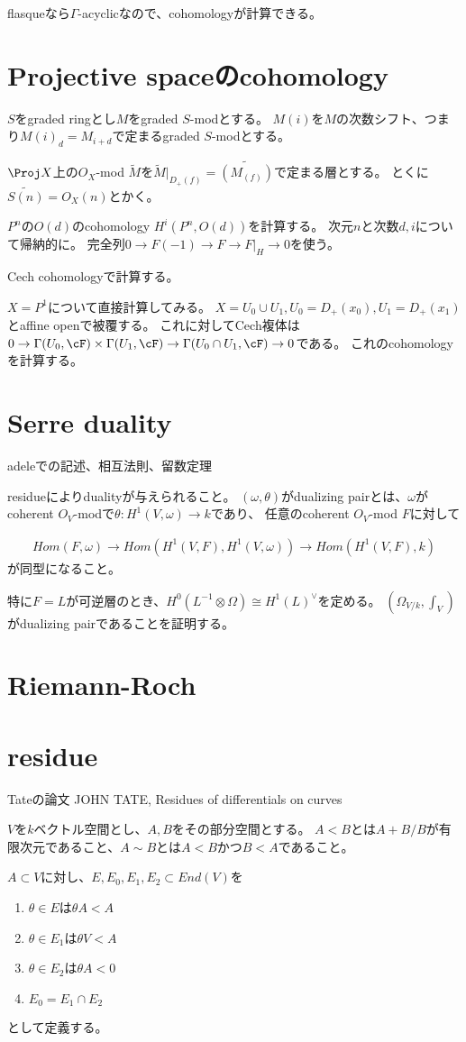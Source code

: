 \documentclass{jsarticle}
\begin{document}
flasqueなら$\Gamma$-acyclicなので、cohomologyが計算できる。

\section{Projective spaceのcohomology}
$S$をgraded ringとし$M$をgraded $S$-modとする。
$M(i)$を$M$の次数シフト、つまり$M(i)_d=M_{i+d}$で定まるgraded $S$-modとする。

$\Proj X$上の$O_X$-mod $\tilde{M}$を$\tilde{M}\vert_{D_+(f)}=\tilde{(M_{(f)})}$で定まる層とする。
とくに$\tilde{S(n)}=O_X(n)$とかく。

$P^n$の$O(d)$のcohomology $H^i(P^n, O(d))$を計算する。
次元$n$と次数$d, i$について帰納的に。
完全列$0 \to F(-1) \to F \to F\vert_H \to 0$を使う。

Cech cohomologyで計算する。

$X=P^1$について直接計算してみる。
$X=U_0 \cup U_1, U_0=D_+(x_0), U_1=D_+(x_1)$とaffine openで被覆する。
これに対してCech複体は$0 \to \Gamma(U_0, \cF) \times \Gamma(U_1, \cF) \to \Gamma(U_0\cap U_1, \cF)\to 0$である。
これのcohomologyを計算する。

\section{Serre duality}
adeleでの記述、相互法則、留数定理

residueによりdualityが与えられること。
$(\omega,\theta)$がdualizing pairとは、$\omega$がcoherent $O_V$-modで$\theta:H^1(V,\omega) \to k$であり、
任意のcoherent $O_V$-mod $F$に対して

\begin{align*}
Hom(F,\omega)\to Hom(H^1(V,F),H^1(V,\omega))\to Hom(H^1(V,F),k)
\end{align*}
が同型になること。

特に$F=L$が可逆層のとき、$H^0(L^{-1}\otimes\Omega)\cong H^1(L)^\vee$を定める。
$(\Omega_{V/k}, \int_V)$がdualizing pairであることを証明する。

\section{Riemann-Roch}

\section{residue}
Tateの論文
JOHN TATE, Residues of differentials on curves
\begin{dfn}
$V$を$k$ベクトル空間とし、$A, B$をその部分空間とする。
$A<B$とは$A+B/B$が有限次元であること、$A\sim B$とは$A<B$かつ$B<A$であること。

$A\subset V$に対し、$E, E_0, E_1, E_2\subset End(V)$を
\begin{enumerate}
\item $\theta\in E$は$\theta A<A$
\item $\theta\in E_1$は$\theta V<A$
\item $\theta\in E_2$は$\theta A<0$
\item $E_0=E_1\cap E_2$
\end{enumerate}
として定義する。
\end{dfn}
\end{document}

